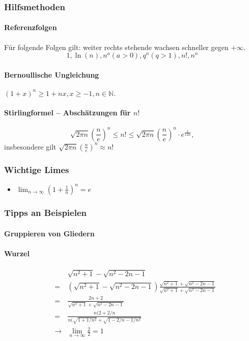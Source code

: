 \documentclass[a4paper, 9pt, DIV=24]{scrartcl}
\newcommand{\N}{\mathbb{N}}
\begin{document}
\subsubsection{Hilfsmethoden}
\paragraph{Referenzfolgen}
Für folgende Folgen gilt: weiter rechts stehende wachsen schneller gegen $+\infty$.
\[1, \ln(n), n^a (a > 0), q^n (q > 1), n!, n^n\]

\paragraph{Bernoullische Ungleichung}
$(1+x)^n \geq 1 + nx, x \geq -1, n \in \N.$

\paragraph{Stirlingformel -- Abschätzungen für $n!$}
\[\sqrt{2\pi n}(\frac{n}{e})^n \leq n! \leq \sqrt{2\pi n}(\frac{n}{e})^n \cdot e^{\frac{1}{12n}}, \] insbesondere gilt 
$\sqrt{2\pi n}(\frac{n}{e})^n \approx n!$
\subsubsection{Wichtige Limes}
\begin{itemize}
\item $\lim_{n\rightarrow \infty} \left( 1+\frac{1}{n} \right)^n=e$
\end{itemize}
\subsubsection{Tipps an Beispielen}
\paragraph{Gruppieren von Gliedern}

\paragraph{Wurzel}
\begin{eqnarray*}
&& \sqrt{n^2+1}-\sqrt{n^2-2n-1} \\ &=&(\sqrt{n^2+1}-\sqrt{n^2-2n-1})\frac{\sqrt{n^2+1}+\sqrt{n^2-2n-1}}{\sqrt{n^2+1}+\sqrt{n^2-2n-1}}\\
  &=& \frac{2n+2}{\sqrt{n^2+1}+\sqrt{n^2-2n-1}} \\
  &=&\frac{n(2+2/n}{n(\sqrt{1+1/n^2}+\sqrt{1-2/n-1/n^2}}\\
  &\rightarrow & \lim_{n\rightarrow \infty} \frac{2}{2}=1
\end{eqnarray*}
\end{document}
